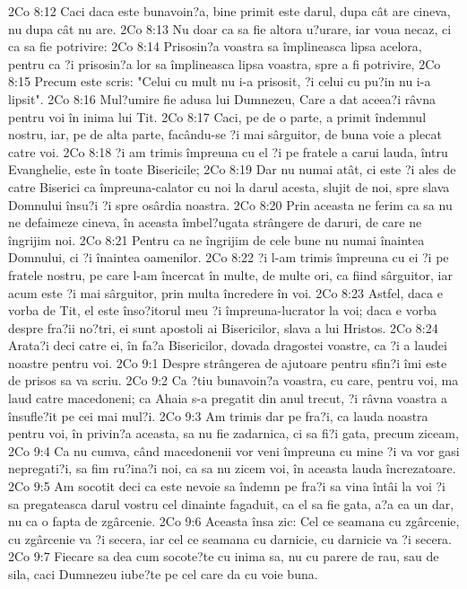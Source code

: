 2Co 8:12  Caci daca este bunavoin?a, bine primit este darul, dupa cât are cineva, nu dupa cât nu are.
2Co 8:13  Nu doar ca sa fie altora u?urare, iar voua necaz, ci ca sa fie potrivire:
2Co 8:14  Prisosin?a voastra sa împlineasca lipsa acelora, pentru ca ?i prisosin?a lor sa împlineasca lipsa voastra, spre a fi potrivire,
2Co 8:15  Precum este scris: "Celui cu mult nu i-a prisosit, ?i celui cu pu?in nu i-a lipsit".
2Co 8:16  Mul?umire fie adusa lui Dumnezeu, Care a dat aceea?i râvna pentru voi în inima lui Tit.
2Co 8:17  Caci, pe de o parte, a primit îndemnul nostru, iar, pe de alta parte, facându-se ?i mai sârguitor, de buna voie a plecat catre voi.
2Co 8:18  ?i am trimis împreuna cu el ?i pe fratele a carui lauda, întru Evanghelie, este în toate Bisericile;
2Co 8:19  Dar nu numai atât, ci este ?i ales de catre Biserici ca împreuna-calator cu noi la darul acesta, slujit de noi, spre slava Domnului însu?i ?i spre osârdia noastra.
2Co 8:20  Prin aceasta ne ferim ca sa nu ne defaimeze cineva, în aceasta îmbel?ugata strângere de daruri, de care ne îngrijim noi.
2Co 8:21  Pentru ca ne îngrijim de cele bune nu numai înaintea Domnului, ci ?i înaintea oamenilor.
2Co 8:22  ?i l-am trimis împreuna cu ei ?i pe fratele nostru, pe care l-am încercat în multe, de multe ori, ca fiind sârguitor, iar acum este ?i mai sârguitor, prin multa încredere în voi.
2Co 8:23  Astfel, daca e vorba de Tit, el este înso?itorul meu ?i împreuna-lucrator la voi; daca e vorba despre fra?ii no?tri, ei sunt apostoli ai Bisericilor, slava a lui Hristos.
2Co 8:24  Arata?i deci catre ei, în fa?a Bisericilor, dovada dragostei voastre, ca ?i a laudei noastre pentru voi.
2Co 9:1  Despre strângerea de ajutoare pentru sfin?i îmi este de prisos sa va scriu.
2Co 9:2  Ca ?tiu bunavoin?a voastra, cu care, pentru voi, ma laud catre macedoneni; ca Ahaia s-a pregatit din anul trecut, ?i râvna voastra a însufle?it pe cei mai mul?i.
2Co 9:3  Am trimis dar pe fra?i, ca lauda noastra pentru voi, în privin?a aceasta, sa nu fie zadarnica, ci sa fi?i gata, precum ziceam,
2Co 9:4  Ca nu cumva, când macedonenii vor veni împreuna cu mine ?i va vor gasi nepregati?i, sa fim ru?ina?i noi, ca sa nu zicem voi, în aceasta lauda încrezatoare.
2Co 9:5  Am socotit deci ca este nevoie sa îndemn pe fra?i sa vina întâi la voi ?i sa pregateasca darul vostru cel dinainte fagaduit, ca el sa fie gata, a?a ca un dar, nu ca o fapta de zgârcenie.
2Co 9:6  Aceasta însa zic: Cel ce seamana cu zgârcenie, cu zgârcenie va ?i secera, iar cel ce seamana cu darnicie, cu darnicie va ?i secera.
2Co 9:7  Fiecare sa dea cum socote?te cu inima sa, nu cu parere de rau, sau de sila, caci Dumnezeu iube?te pe cel care da cu voie buna.
